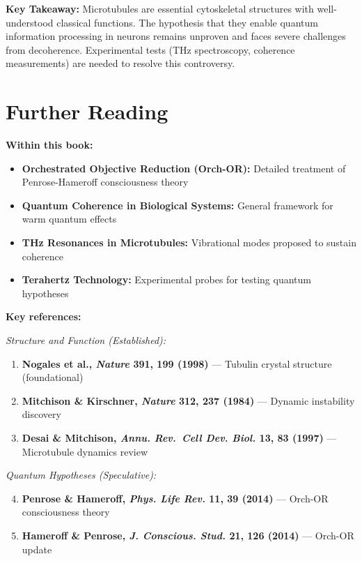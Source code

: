 \begin{keyconcept}
\textbf{Key Takeaway:} Microtubules are essential cytoskeletal structures with well-understood classical functions. The hypothesis that they enable quantum information processing in neurons remains unproven and faces severe challenges from decoherence. Experimental tests (THz spectroscopy, coherence measurements) are needed to resolve this controversy.
\end{keyconcept}

\section{Further Reading}

\textbf{Within this book:}
\begin{itemize}
\item \textbf{Orchestrated Objective Reduction (Orch-OR):} Detailed treatment of Penrose-Hameroff consciousness theory
\item \textbf{Quantum Coherence in Biological Systems:} General framework for warm quantum effects
\item \textbf{THz Resonances in Microtubules:} Vibrational modes proposed to sustain coherence
\item \textbf{Terahertz Technology:} Experimental probes for testing quantum hypotheses
\end{itemize}

\textbf{Key references:}

\textit{Structure and Function (Established):}
\begin{enumerate}
\item \textbf{Nogales et al., \emph{Nature} 391, 199 (1998)} --- Tubulin crystal structure (foundational)
\item \textbf{Mitchison \& Kirschner, \emph{Nature} 312, 237 (1984)} --- Dynamic instability discovery
\item \textbf{Desai \& Mitchison, \emph{Annu. Rev.~Cell Dev. Biol.} 13, 83 (1997)} --- Microtubule dynamics review
\end{enumerate}

\textit{Quantum Hypotheses (Speculative):}
\begin{enumerate}
\setcounter{enumi}{3}
\item \textbf{Penrose \& Hameroff, \emph{Phys. Life Rev.} 11, 39 (2014)} --- Orch-OR consciousness theory
\item \textbf{Hameroff \& Penrose, \emph{J. Conscious. Stud.} 21, 126 (2014)} --- Orch-OR update
\end{enumerate}

